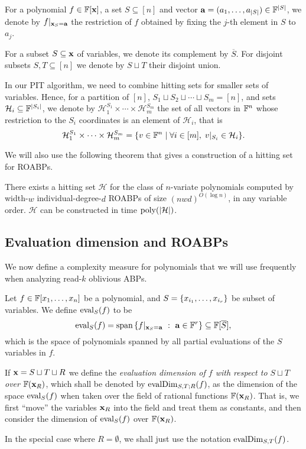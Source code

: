 \documentclass[11pt]{article}
\newcommand{\cH}{\mathcal{H}}
\begin{document}
For a polynomial $f \in \F[\vecx]$, a set $S \subseteq [n]$ and vector $\veca = (a_1, \ldots, a_{|S|}) \in \F^{|S|}$, we denote by $f|_{\mathbf{x}_S = \mathbf{a}}$ the restriction of $f$ obtained by fixing the $j$-th element in $S$ to $a_j$.


For a subset $S \subseteq \mathbf{x}$ of variables, we denote its complement by $\overline{S}$. For disjoint subsets $S, T \subseteq [n]$ we denote by $S \sqcup T$ their disjoint union.

In our PIT algorithm, we need to combine hitting sets for smaller sets of variables. Hence, for a partition of $[n]$, $S_1\sqcup S_2\sqcup \cdots \sqcup S_m = [n]$, and sets $\cH_i \subseteq \F^{|S_i|}$, we denote by $\cH_1^{S_1}\times \cdots \times \cH_m^{S_m}$ the set of all vectors in $\F^n$ whose restriction to the $S_i$ coordinates is an element of $\cH_i$, that is
\[
\cH_1^{S_1}\times \cdots \times \cH_m^{S_m} = \{ v \in\F^n \mid \forall i\in [m], \; v|_{S_i} \in \cH_i  \}.
\]

We will also use the following theorem that gives a construction of a hitting set for ROABPs.

\begin{theorem}
\label{thm:hitting-set-ROABP}
There exists a hitting set $\cH$ for the class of $n$-variate polynomials computed by width-$w$ individual-degree-$d$ ROABPs of size $(nwd)^{O(\log n)}$, in any variable order. $\cH$ can be constructed in time $\poly(|\cH|)$.
\end{theorem}


\subsection{Evaluation dimension and ROABPs}

We now define a complexity measure for polynomials that we will use frequently when analyzing read-$k$ oblivious ABPs.

\begin{definition}
Let $f \in \F[x_1, \ldots, x_n]$ be a polynomial, and $S = \left\{ x_{i_1},\ldots, x_{i_r} \right\}$ be subset of variables.
We define $\operatorname{eval}_S(f)$ to be
\[
\eval_S(f) = \Span\setdef{f|_{\vecx_S=\veca}}{\veca \in \F^r} \subseteq \F[\overline{S}],
\]
which is the space of polynomials spanned by all partial evaluations of the $S$ variables in $f$. 

If $\mathbf{x} = S \sqcup T \sqcup R$ we define the \emph{evaluation dimension of $f$ with respect to $S \sqcup T$ over $\F(\vecx_R)$}, which shall be denoted by $\operatorname{evalDim}_{S,T;R}(f)$, as the dimension of the space $\operatorname{eval}_S(f)$ when taken over the field of rational functions $\F(\vecx_R)$. That is, we first ``move'' the variables $\mathbf{x}_R$ into the field and treat them as constants, and then consider the dimension of $\operatorname{eval}_S(f)$ over $\F(\vecx_R)$.

In the special case where $R=\emptyset$, we shall just use the notation $\operatorname{evalDim}_{S,T}(f)$.
\end{definition}
\end{document}
